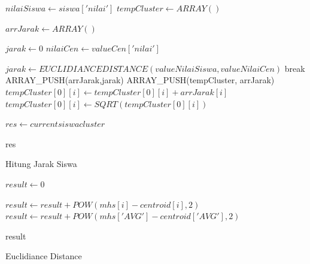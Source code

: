 \begin{algorithm}[H]
  \begin{algorithmic}[1]
        \State $nilaiSiswa \gets siswa['nilai']$
        \State $tempCluster \gets ARRAY()$
        
            \State $arrJarak \gets ARRAY()$
            
                \State $jarak \gets 0$
                \State $nilaiCen \gets valueCen['nilai']$
                
                    \State $jarak \gets EUCLIDIANCEDISTANCE(valueNilaiSiswa, valueNilaiCen)$
                        \State break
                    \EndIf
                \EndFor
                \State ARRAY\_PUSH(arrJarak,jarak)
            \EndFor
                \State ARRAY\_PUSH(tempCluster, arrJarak)
            \Else
                    \State $tempCluster[0][i] \gets tempCluster[0][i]+ arrJarak[i]$
                    \State $tempCluster[0][i] \gets SQRT(tempCluster[0][i])$
                \EndFor
            \EndIf
        \EndFor
        
        \State $res \gets current siswa cluster$
        
        \State \Return res
    \EndProcedure
  \end{algorithmic} 
  \caption{Hitung Jarak Siswa}
  \label{alg:hitungJarakSiswa}
\end{algorithm}

\begin{algorithm}[H]
  \begin{algorithmic}[1]
        \State $result \gets 0$
        
            \State $result \gets result + POW(mhs[i]-centroid[i],2)$
        \EndFor
        \State $result \gets result + POW(mhs['AVG']-centroid['AVG'],2)$
        
        \State \Return result
    \EndProcedure
  \end{algorithmic} 
  \caption{Euclidiance Distance}
  \label{alg:euclidianceDistance}
\end{algorithm}

